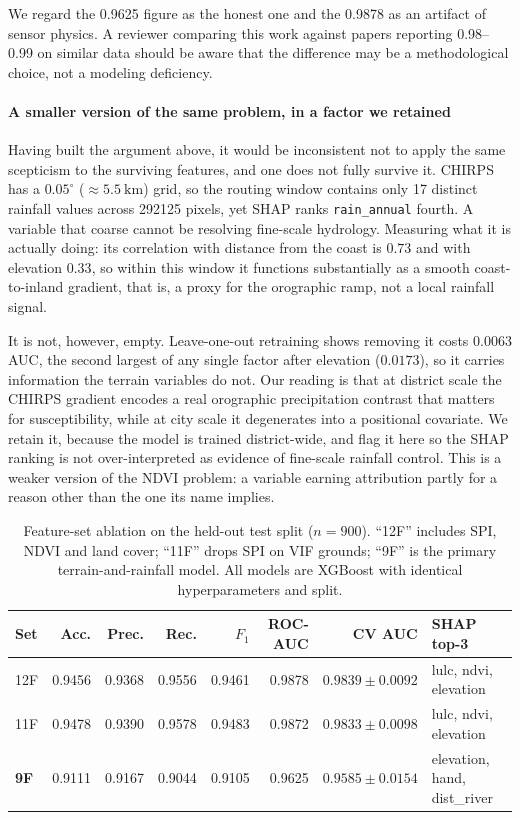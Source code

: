 \documentclass[10pt,twocolumn]{article}
\begin{document}
We regard the 0.9625 figure as the honest one and the 0.9878 as an artifact of
sensor physics. A reviewer comparing this work against papers reporting
0.98--0.99 on similar data should be aware that the difference may be a
methodological choice, not a modeling deficiency.

\paragraph{A smaller version of the same problem, in a factor we retained}
Having built the argument above, it would be inconsistent not to apply the same
scepticism to the surviving features, and one does not fully survive it. CHIRPS
has a $0.05^\circ$ ($\approx\SI{5.5}{\kilo\metre}$) grid, so the routing window
contains only 17 distinct rainfall values across \num{292125} pixels, yet SHAP
ranks \texttt{rain\_annual} fourth. A variable that coarse cannot be resolving
fine-scale hydrology. Measuring what it is actually doing: its correlation with
distance from the coast is $0.73$ and with elevation $0.33$, so within this
window it functions substantially as a smooth coast-to-inland gradient, that is,
a proxy for the orographic ramp, not a local rainfall signal.

It is not, however, empty. Leave-one-out retraining shows removing it costs
$0.0063$ AUC, the second largest of any single factor after elevation
($0.0173$), so it carries information the terrain variables do not. Our reading
is that at district scale the CHIRPS gradient encodes a real orographic
precipitation contrast that matters for susceptibility, while at city scale it
degenerates into a positional covariate. We retain it, because the model is
trained district-wide, and flag it here so the SHAP ranking is not
over-interpreted as evidence of fine-scale rainfall control. This is a weaker
version of the NDVI problem: a variable earning attribution partly for a reason
other than the one its name implies.

\begin{table}[!t]
\centering\footnotesize
\caption{Feature-set ablation on the held-out test split ($n=900$). ``12F''
includes SPI, NDVI and land cover; ``11F'' drops SPI on VIF grounds; ``9F'' is
the primary terrain-and-rainfall model. All models are XGBoost with identical
hyperparameters and split.}
\label{tab:ablation}
\small
\begin{tabular}{@{}lrrrrrrl@{}}
\toprule
\textbf{Set} & \textbf{Acc.} & \textbf{Prec.} & \textbf{Rec.} & \textbf{$F_1$} &
\textbf{ROC-AUC} & \textbf{CV AUC} & \textbf{SHAP top-3} \\
\midrule
12F & 0.9456 & 0.9368 & 0.9556 & 0.9461 & 0.9878 & $0.9839\pm0.0092$ & lulc, ndvi, elevation \\
11F & 0.9478 & 0.9390 & 0.9578 & 0.9483 & 0.9872 & $0.9833\pm0.0098$ & lulc, ndvi, elevation \\
\textbf{9F} & 0.9111 & 0.9167 & 0.9044 & 0.9105 & 0.9625 & $0.9585\pm0.0154$ & elevation, hand, dist\_river \\
\bottomrule
\end{tabular}
\end{table}
\end{document}
